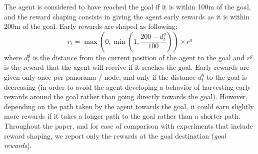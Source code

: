 The agent is considered to have reached the goal if it is within 100m of the goal, and the reward shaping consists in giving the agent early rewards as it is within 200m of the goal. Early rewards are shaped as following:
\[
r_t = \max \left( 0, \min \left( 1, \frac{200 - d^g_t}{100} \right) \right) \times r^g
\]
where $d^g_t$ is the distance from the current position of the agent to the goal and $r^g$ is the reward that the agent will receive if it reaches the goal. Early rewards are given only once per panorama / node, and only if the distance $d^g_t$ to the goal is decreasing (in order to avoid the agent developing a behavior of harvesting early rewards around the goal rather than going directly towards the goal). However, depending on the path taken by the agent towards the goal, it could earn slightly more rewards if it takes a longer path to the goal rather than a shorter path. Throughout the paper, and for ease of comparison with experiments that include reward shaping, we report only the rewards at the goal destination (\emph{goal rewards}).